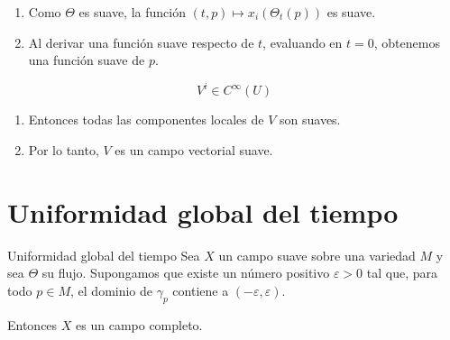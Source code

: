 \begin{bookproof}{}
\[\]
\begin{enumerate}[start=14]
\item Como $\Theta$ es suave, la función $(t,p)\mapsto x_i(\Theta_t(p))$ es suave.
\item Al derivar una función suave respecto de $t$, evaluando en $t=0$, obtenemos una función suave de $p$.
\end{enumerate}
\[
V^i\in C^\infty(U)
\]
\begin{enumerate}[start=16]
\item Entonces todas las componentes locales de $V$ son suaves.
\item Por lo tanto, $V$ es un campo vectorial suave.
\end{enumerate}
\bookqed
\end{bookproof}
\label{blk:906978}
\section{Uniformidad global del tiempo}
\begin{booklemma}{Uniformidad global del tiempo}
Sea $X$ un campo suave sobre una variedad $M$ y sea $\Theta$ su flujo. Supongamos que existe un número positivo $\varepsilon>0$ tal que, para todo $p\in M$, el dominio de $\gamma_p$ contiene a $(-\varepsilon,\varepsilon)$.

Entonces $X$ es un campo completo.

\end{booklemma}
